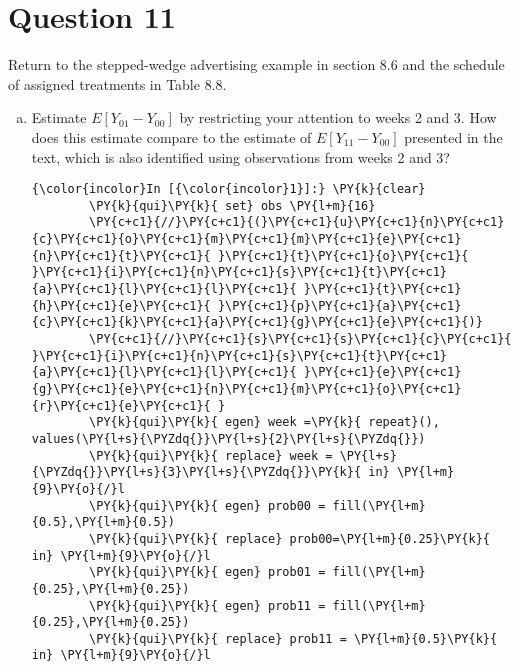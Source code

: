 \documentclass[11pt,notitlepage]{article}\usepackage[]{graphicx}\usepackage[]{color}
\makeatletter
\newenvironment{kframe}{%
 \def\at@end@of@kframe{}%
 \ifinner\ifhmode%
  \def\at@end@of@kframe{\end{minipage}}%
  \begin{minipage}{\columnwidth}%
 \fi\fi%
 \def\FrameCommand##1{\hskip\@totalleftmargin \hskip-\fboxsep
 \colorbox{shadecolor}{##1}\hskip-\fboxsep
     \hskip-\linewidth \hskip-\@totalleftmargin \hskip\columnwidth}%
 \MakeFramed {\advance\hsize-\width
   \@totalleftmargin\z@ \linewidth\hsize
   \@setminipage}}%
 {\par\unskip\endMakeFramed%
 \at@end@of@kframe}
\newenvironment{knitrout}{}{} %
\makeatother
\begin{document}
\section*{Question 11}
Return to the stepped-wedge advertising example in section 8.6 and the schedule of assigned treatments in Table 8.8.
\begin{enumerate}[a)]
\item Estimate $E[Y_{01}-Y_{00}]$ by restricting your attention to weeks 2 and 3. How does this estimate compare to the estimate of $E[Y_{11} - Y_{00}]$ presented in the text, which is also identified using observations from weeks 2 and 3?

\begin{knitrout}
\color{fgcolor}\begin{kframe}
    \begin{Verbatim}[commandchars=\\\{\}]
{\color{incolor}In [{\color{incolor}1}]:} \PY{k}{clear}
        \PY{k}{qui}\PY{k}{ set} obs \PY{l+m}{16}
        \PY{c+c1}{//}\PY{c+c1}{(}\PY{c+c1}{u}\PY{c+c1}{n}\PY{c+c1}{c}\PY{c+c1}{o}\PY{c+c1}{m}\PY{c+c1}{m}\PY{c+c1}{e}\PY{c+c1}{n}\PY{c+c1}{t}\PY{c+c1}{ }\PY{c+c1}{t}\PY{c+c1}{o}\PY{c+c1}{ }\PY{c+c1}{i}\PY{c+c1}{n}\PY{c+c1}{s}\PY{c+c1}{t}\PY{c+c1}{a}\PY{c+c1}{l}\PY{c+c1}{l}\PY{c+c1}{ }\PY{c+c1}{t}\PY{c+c1}{h}\PY{c+c1}{e}\PY{c+c1}{ }\PY{c+c1}{p}\PY{c+c1}{a}\PY{c+c1}{c}\PY{c+c1}{k}\PY{c+c1}{a}\PY{c+c1}{g}\PY{c+c1}{e}\PY{c+c1}{)}
        \PY{c+c1}{//}\PY{c+c1}{s}\PY{c+c1}{s}\PY{c+c1}{c}\PY{c+c1}{ }\PY{c+c1}{i}\PY{c+c1}{n}\PY{c+c1}{s}\PY{c+c1}{t}\PY{c+c1}{a}\PY{c+c1}{l}\PY{c+c1}{l}\PY{c+c1}{ }\PY{c+c1}{e}\PY{c+c1}{g}\PY{c+c1}{e}\PY{c+c1}{n}\PY{c+c1}{m}\PY{c+c1}{o}\PY{c+c1}{r}\PY{c+c1}{e}\PY{c+c1}{ }
        \PY{k}{qui}\PY{k}{ egen} week =\PY{k}{ repeat}(), values(\PY{l+s}{\PYZdq{}}\PY{l+s}{2}\PY{l+s}{\PYZdq{}})
        \PY{k}{qui}\PY{k}{ replace} week = \PY{l+s}{\PYZdq{}}\PY{l+s}{3}\PY{l+s}{\PYZdq{}}\PY{k}{ in} \PY{l+m}{9}\PY{o}{/}l
        \PY{k}{qui}\PY{k}{ egen} prob00 = fill(\PY{l+m}{0.5},\PY{l+m}{0.5})
        \PY{k}{qui}\PY{k}{ replace} prob00=\PY{l+m}{0.25}\PY{k}{ in} \PY{l+m}{9}\PY{o}{/}l
        \PY{k}{qui}\PY{k}{ egen} prob01 = fill(\PY{l+m}{0.25},\PY{l+m}{0.25})
        \PY{k}{qui}\PY{k}{ egen} prob11 = fill(\PY{l+m}{0.25},\PY{l+m}{0.25})
        \PY{k}{qui}\PY{k}{ replace} prob11 = \PY{l+m}{0.5}\PY{k}{ in} \PY{l+m}{9}\PY{o}{/}l
\end{Verbatim}



\end{kframe}
\end{knitrout}
\end{enumerate}
\end{document}
